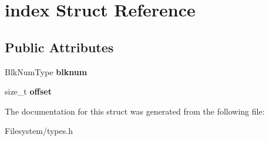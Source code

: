 \hypertarget{structindex}{}\section{index Struct Reference}
\label{structindex}
\subsection*{Public Attributes}
\begin{DoxyCompactItemize}
\item 
\mbox{\label{structindex_a4601f529cd0b66a29506c272687be78d}} 
Blk\+Num\+Type {\bfseries blknum}
\item 
\mbox{\label{structindex_a5ebe7af77c7d366b339d77f992078e11}} 
size\+\_\+t {\bfseries offset}
\end{DoxyCompactItemize}


The documentation for this struct was generated from the following file\+:\begin{DoxyCompactItemize}
\item 
Filesystem/types.\+h\end{DoxyCompactItemize}
